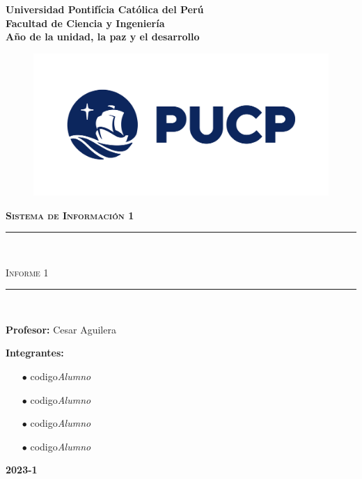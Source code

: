 \begin{titlepage}
	\begin{center}
		{\Huge \textbf{Universidad Pontifícia Católica del Perú}}\\
		\vspace{3mm}
		{\Huge \textbf{Facultad de Ciencia y Ingeniería }}\\
		\vspace{1cm}
    {\Huge\textbf{Año de la unidad, la paz y el desarrollo}}\\
    \vspace{1cm}
		\begin{figure}[h]
			\centering
			\includegraphics[width=15cm]{cover/logo_PUCP.png}
		\end{figure}
		\vspace{5mm}
		{\LARGE \textbf{\textsc{Sistema de Información 1}}}
		\vspace{2mm}
		\textcolor{PUCP}{\rule{\linewidth}{0.75mm}}\\
		\begin{spacing}{1}
			\LARGE\textsc{Informe 1}
		\end{spacing}
		\textcolor{PUCP}{\rule{\linewidth}{0.75mm}}\\
		
		\vspace{1cm}
		\begin{flushleft}
			{\Large\textbf{Profesor: } Cesar Aguilera}
			\vspace{2mm}
			
			{\Large\textbf{Integrantes:}}
			\begin{itemize}\Large
				\item[$ \bullet $] codigo\dotfill\textsl{Alumno}
				\item[$ \bullet $] codigo\dotfill\textsl{Alumno}
				\item[$ \bullet $] codigo\dotfill\textsl{Alumno}
				\item[$ \bullet $] codigo\dotfill\textsl{Alumno}
			\end{itemize}
		\end{flushleft}
		\vfill
		{\Huge \textbf{2023-1}}
	\end{center}
\end{titlepage}